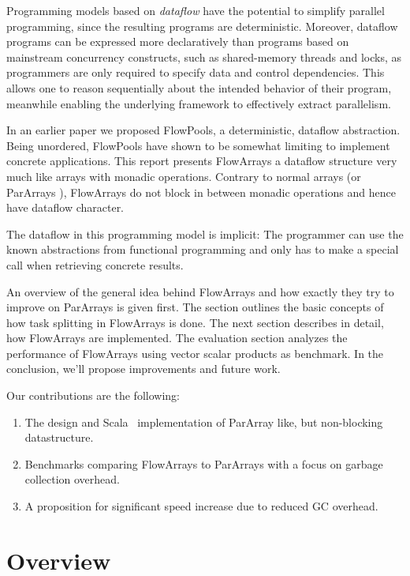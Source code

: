 \documentclass[runningheads,a4paper,fleqn]{llncs}
\begin{document}
Programming models based on \emph{dataflow} \cite{Arvind89,CnC10} have the
potential to simplify parallel programming, since the resulting programs are
deterministic. Moreover, dataflow programs can be expressed more declaratively
than programs based on mainstream concurrency constructs, such as shared-memory 
threads and locks, as programmers are only required to specify data and
control dependencies. This allows one to reason sequentially about the
intended behavior of their program, meanwhile enabling the underlying
framework to effectively extract parallelism.

In an earlier paper \cite{FP12} we proposed FlowPools, a
deterministic, dataflow abstraction. Being unordered, FlowPools have
shown to be somewhat limiting to implement concrete applications. This
report presents FlowArrays a dataflow structure very much like arrays
with monadic operations. Contrary to normal arrays (or ParArrays
\cite{collect11}), FlowArrays do not block in between monadic
operations and hence have dataflow character.

The dataflow in this programming model is implicit: The programmer can
use the known abstractions from functional programming and only has to
make a special call when retrieving concrete results.

An overview of the general idea behind FlowArrays and how exactly they
try to improve on ParArrays is given first. The section outlines the
basic concepts of how task splitting in FlowArrays is done. The next
section describes in detail, how FlowArrays are implemented. The
evaluation section analyzes the performance of FlowArrays using vector
scalar products as benchmark. In the conclusion, we'll propose
improvements and future work.

Our contributions are the following:
\begin{enumerate}
\item The design and Scala~\cite{Odersky10} implementation of ParArray
  like, but non-blocking datastructure.
\item Benchmarks comparing FlowArrays to ParArrays with a focus on
  garbage collection overhead.
\item A proposition for significant speed increase due to reduced GC
  overhead.
\end{enumerate}

\section{Overview}
\label{sec:overview}
\end{document}
